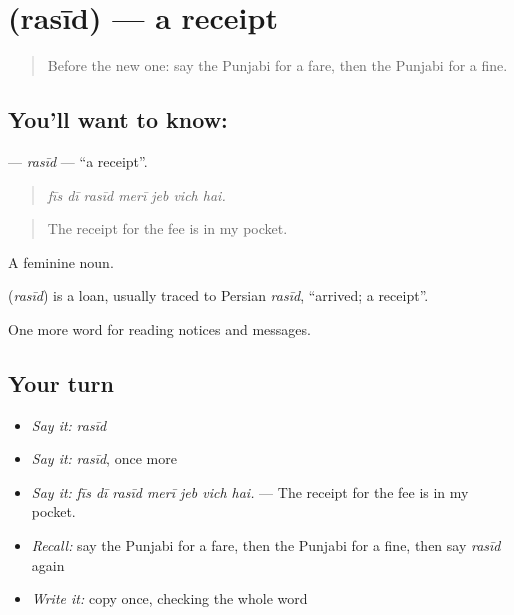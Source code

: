 \section[\texorpdfstring{\pa{ਰਸੀਦ} (rasīd)}{ਰਸੀਦ (rasīd)}]{ (rasīd) — a receipt}

\label{lesson:PA-C262-rasid}



\begin{quote}
Before the new one: say the Punjabi for a fare, then the Punjabi for a fine.
\end{quote}

\subsection*{You'll want to know: }
\textbf{} — \emph{rasīd} — \textquotedblleft{}a receipt\textquotedblright{}.

\begin{quote}
      
\end{quote}

\begin{quote}
\emph{fīs dī rasīd merī jeb vich hai.}
\end{quote}

\begin{quote}
The receipt for the fee is in my pocket.
\end{quote}

A feminine noun.

\begin{cousinweb}
\textbf{} (\emph{rasīd}) is a loan, usually traced to Persian \emph{rasīd}, \textquotedblleft{}arrived; a receipt\textquotedblright{}.
\end{cousinweb}

\begin{grammarlens}[title={What you've built}]
One more word for reading notices and messages.
\end{grammarlens}

\subsection*{Your turn}
\begin{itemize}
\raggedright
  \item \emph{Say it:} \emph{rasīd}
  \item \emph{Say it:} \emph{rasīd}, once more
  \item \emph{Say it:} \emph{fīs dī rasīd merī jeb vich hai.} — The receipt for the fee is in my pocket.
  \item \emph{Recall:} say the Punjabi for a fare, then the Punjabi for a fine, then say \emph{rasīd} again
  \item \emph{Write it:} copy \textbf{} once, checking the whole word
\end{itemize}

